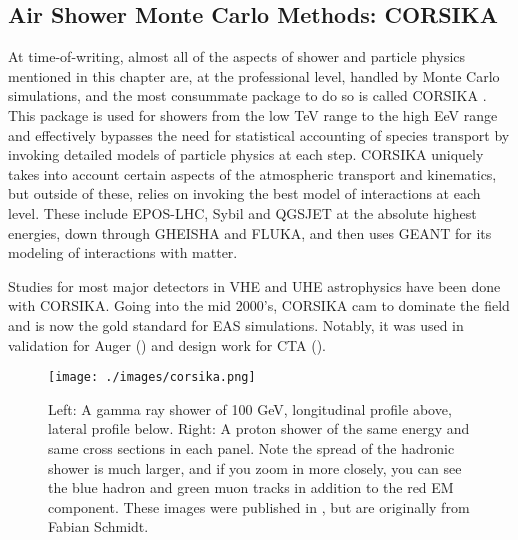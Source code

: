 \subsection{Air Shower Monte Carlo Methods: CORSIKA}
\label{corsika}
At time-of-writing, almost all of the aspects of shower and particle physics mentioned in this chapter are, at the professional level, handled by Monte Carlo simulations, and the most consummate package to do so is called CORSIKA \cite{corsika}. This package is used for showers from the low TeV range to the high EeV range and effectively bypasses the need for statistical accounting of species transport by invoking detailed models of particle physics at each step. CORSIKA uniquely takes into account certain aspects of the atmospheric transport and kinematics, but outside of these, relies on invoking the best model of interactions at each level. These include EPOS-LHC, Sybil and QGSJET at the absolute highest energies, down through GHEISHA and FLUKA, and then uses GEANT for its modeling of interactions with matter.

Studies for most major detectors in VHE and UHE astrophysics have been done with CORSIKA. Going into the mid 2000's, CORSIKA cam to dominate the field and is now the gold standard for EAS simulations. Notably, it was used in validation for Auger () and design work for CTA ().
\begin{figure}[h!]
\begin{center}
\texttt{[image: ./images/corsika.png]}
\caption[CORSIKA: Gamma Rays Versus Hadrons]{Left: A gamma ray shower of 100 GeV, longitudinal profile above, lateral profile below. Right: A proton shower of the same energy and same cross sections in each panel. Note the spread of the hadronic shower is much larger, and if you zoom in more closely, you can see the blue hadron and green muon tracks in addition to the red EM component. These images were published in , but are originally from Fabian Schmidt.}
\label{corsikadiag}
\end{center}
\end{figure}


\newpage
